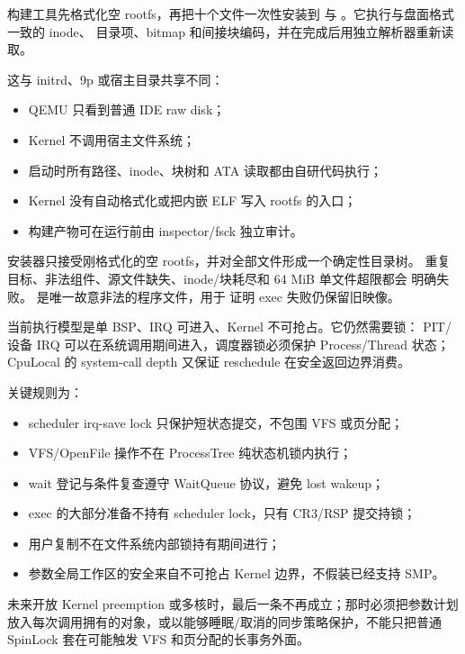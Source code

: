 构建工具先格式化空 rootfs，再把十个文件一次性安装到
 与 。它执行与盘面格式一致的 inode、
目录项、bitmap 和间接块编码，并在完成后用独立解析器重新读取。

这与 initrd、9p 或宿主目录共享不同：

\begin{itemize}
  \item QEMU 只看到普通 IDE raw disk；
  \item Kernel 不调用宿主文件系统；
  \item 启动时所有路径、inode、块树和 ATA 读取都由自研代码执行；
  \item Kernel 没有自动格式化或把内嵌 ELF 写入 rootfs 的入口；
  \item 构建产物可在运行前由 inspector/fsck 独立审计。
\end{itemize}

安装器只接受刚格式化的空 rootfs，并对全部文件形成一个确定性目录树。
重复目标、非法组件、源文件缺失、inode/块耗尽和 64 MiB 单文件超限都会
明确失败。 是唯一故意非法的程序文件，用于
证明 exec 失败仍保留旧映像。

当前执行模型是单 BSP、IRQ 可进入、Kernel 不可抢占。它仍然需要锁：
PIT/设备 IRQ 可以在系统调用期间进入，调度器锁必须保护 Process/Thread
状态；CpuLocal 的 system-call depth 又保证 reschedule 在安全返回边界消费。

关键规则为：

\begin{itemize}
  \item scheduler irq-save lock 只保护短状态提交，不包围 VFS 或页分配；
  \item VFS/OpenFile 操作不在 ProcessTree 纯状态机锁内执行；
  \item wait 登记与条件复查遵守 WaitQueue 协议，避免 lost wakeup；
  \item exec 的大部分准备不持有 scheduler lock，只有 CR3/RSP 提交持锁；
  \item 用户复制不在文件系统内部锁持有期间进行；
  \item 参数全局工作区的安全来自不可抢占 Kernel 边界，不假装已经支持 SMP。
\end{itemize}

未来开放 Kernel preemption 或多核时，最后一条不再成立；那时必须把参数计划
放入每次调用拥有的对象，或以能够睡眠/取消的同步策略保护，不能只把普通
SpinLock 套在可能触发 VFS 和页分配的长事务外面。

